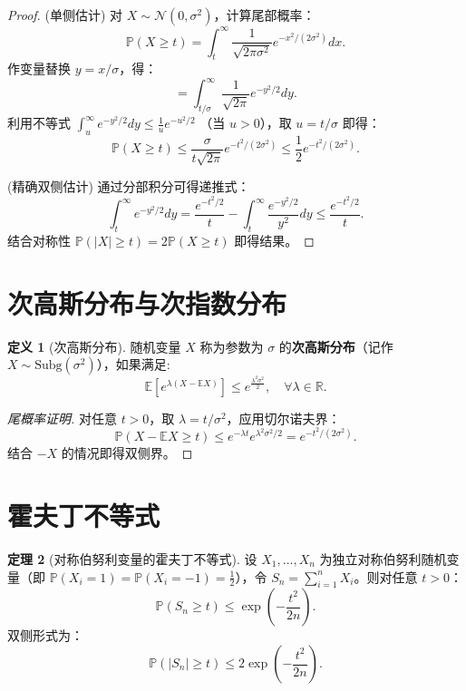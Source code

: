\documentclass{article}
\theoremstyle{definition}
\newtheorem{theorem}{定理}
\newtheorem{definition}[theorem]{定义}
\renewcommand{\P}{\mathbb{P}}
\newcommand{\E}{\mathbb{E}}
\newcommand{\R}{\mathbb{R}}
\newcommand{\1}{\mathbf{1}}
\newcommand{\subg}{\text{Subg}}
\begin{document}
\begin{proof}
(单侧估计) 对 \( X \sim \mathcal{N}(0, \sigma^2) \)，计算尾部概率：
\[
\P(X \geq t) = \int_t^\infty \frac{1}{\sqrt{2\pi\sigma^2}} e^{-x^2/(2\sigma^2)} dx.
\]
作变量替换 \( y = x/\sigma \)，得：
\[
= \int_{t/\sigma}^\infty \frac{1}{\sqrt{2\pi}} e^{-y^2/2} dy.
\]
利用不等式 \( \int_u^\infty e^{-y^2/2} dy \leq \frac{1}{u} e^{-u^2/2} \) （当 \( u > 0 \)），取 \( u = t/\sigma \) 即得：
\[
\P(X \geq t) \leq \frac{\sigma}{t\sqrt{2\pi}} e^{-t^2/(2\sigma^2)} \leq \frac{1}{2} e^{-t^2/(2\sigma^2)}.
\]

(精确双侧估计) 通过分部积分可得递推式：
\[
\int_t^\infty e^{-y^2/2} dy = \frac{e^{-t^2/2}}{t} - \int_t^\infty \frac{e^{-y^2/2}}{y^2} dy \leq \frac{e^{-t^2/2}}{t}.
\]
结合对称性 \( \P(|X| \geq t) = 2\P(X \geq t) \) 即得结果。
\end{proof}



\section{次高斯分布与次指数分布}

\begin{definition}[次高斯分布]
随机变量 \( X \) 称为参数为 \( \sigma \) 的\textbf{次高斯分布}（记作 \( X \sim \subg(\sigma^2) \)），如果满足:
\[
\E\left[e^{\lambda (X - \E X)}\right] \leq e^{\frac{\lambda^2 \sigma^2}{2}}, \quad \forall \lambda \in \R.
\]
\end{definition}

\begin{proof}[尾概率证明]
对任意 \( t > 0 \)，取 \( \lambda = t/\sigma^2 \)，应用切尔诺夫界：
\[
\P(X - \E X \geq t) \leq e^{-\lambda t} e^{\lambda^2 \sigma^2/2} = e^{-t^2/(2\sigma^2)}.
\]
结合 \( -X \) 的情况即得双侧界。
\end{proof}

\section{霍夫丁不等式}

\begin{theorem}[对称伯努利变量的霍夫丁不等式]
设 \( X_1, \dots, X_n \) 为独立对称伯努利随机变量（即 \( \P(X_i = 1) = \P(X_i = -1) = \frac{1}{2} \)），令 \( S_n = \sum_{i=1}^n X_i \)。则对任意 \( t > 0 \)：
\[
\P(S_n \geq t) \leq \exp\left(-\frac{t^2}{2n}\right).
\]
双侧形式为：
\[
\P(|S_n| \geq t) \leq 2\exp\left(-\frac{t^2}{2n}\right).
\]
\end{theorem}
\end{document}

